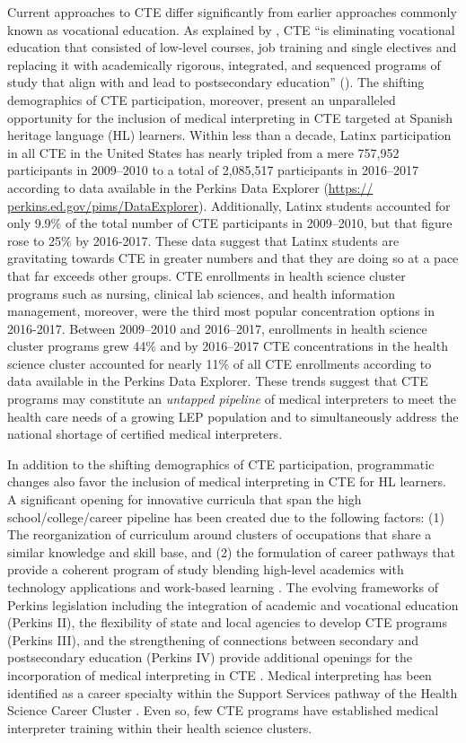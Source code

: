 \documentclass[output=paper]{langscibook}
\begin{document}
 Current approaches to CTE differ significantly from earlier approaches commonly known as vocational education. As explained by \citet{BrandBrowning2013}, CTE “is eliminating vocational education that consisted of low-level courses, job training and single electives and replacing it with academically rigorous, integrated, and sequenced programs of study that align with and lead to postsecondary education” (\citeyear[2]{BrandBrowning2013}). The shifting demographics of CTE participation, moreover, present an unparalleled opportunity for the inclusion of medical interpreting in CTE targeted at Spanish heritage language (HL) learners. Within less than a decade, Latinx participation in all CTE in the United States has nearly tripled from a mere 757,952 participants in 2009--2010 to a total of 2,085,517 participants in 2016--2017 according to data available in the Perkins Data Explorer (\href{https://perkins.ed.gov/pims/DataExplorer}{{https:// perkins.ed.gov/pims/DataExplorer}}). Additionally, Latinx students accounted for only 9.9\% of the total number of CTE participants in 2009--2010, but that figure rose to 25\% by 2016-2017. These data suggest that Latinx students are gravitating towards CTE in greater numbers and that they are doing so at a pace that far exceeds other groups. CTE enrollments in health science cluster programs such as nursing, clinical lab sciences, and health information management, moreover, were the third most popular concentration options in 2016-2017. Between 2009--2010 and 2016--2017, enrollments in health science cluster programs grew 44\% and by 2016--2017 CTE concentrations in the health science cluster accounted for nearly 11\% of all CTE enrollments according to data available in the Perkins Data Explorer. These trends suggest that CTE programs may constitute an \textit{untapped pipeline} of medical interpreters to meet the health care needs of a growing LEP population and to simultaneously address the national shortage of certified medical interpreters.

In addition to the shifting demographics of CTE participation, programmatic changes also favor the inclusion of medical interpreting in CTE for HL learners. A significant opening for innovative curricula that span the high school/college/career pipeline has been created due to the following factors: (1) The reorganization of curriculum around clusters of occupations that share a similar knowledge and skill base, and (2) the formulation of career pathways that provide a coherent program of study blending high-level academics with technology applications and work-based learning \citep{CastellanoStone2003}. The evolving frameworks of Perkins legislation including the integration of academic and vocational education (Perkins II), the flexibility of state and local agencies to develop CTE programs (Perkins III), and the strengthening of connections between secondary and postsecondary education (Perkins IV) provide additional openings for the incorporation of medical interpreting in CTE \citep{Jocson2018}. Medical interpreting has been identified as a career specialty within the Support Services pathway of the Health Science Career Cluster \citep{AdvanceCTE2012}. Even so, few CTE programs have established medical interpreter training within their health science clusters.
\end{document}
